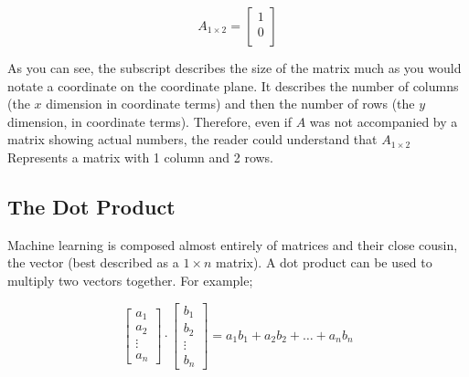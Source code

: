 \documentclass{memoir}
\begin{document}
\[
	A_{1\times2} =
	\begin{bmatrix}
		1 \\
		0 \\
	\end{bmatrix}
\]

As you can see, the subscript describes the size of the matrix much as you would notate a coordinate on the coordinate plane. It describes the number of columns (the $x$ dimension in coordinate terms) and then the number of rows (the $y$ dimension, in coordinate terms). Therefore, even if $A$ was not accompanied by a matrix showing actual numbers, the reader could understand that $A_{1\times2}$ Represents a matrix with 1 column and 2 rows.

\subsection{The Dot Product}

Machine learning is composed almost entirely of matrices and their close cousin, the vector (best described as a $1\times n$ matrix). A dot product can be used to multiply two  vectors together. For example;

\[
	\begin{bmatrix}
		a_1    \\
		a_2    \\
		\vdots \\
		a_n
	\end{bmatrix}
	\cdot
	\begin{bmatrix}
		b_1    \\
		b_2    \\
		\vdots \\
		b_n
	\end{bmatrix}
	= a_1b_1 + a_2b_2+ \dots +a_nb_n
\] %
\end{document}
